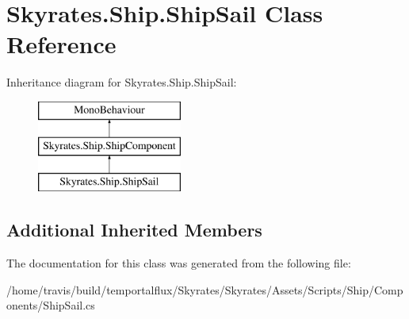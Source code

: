 \hypertarget{class_skyrates_1_1_ship_1_1_ship_sail}{\section{Skyrates.\-Ship.\-Ship\-Sail Class Reference}
\label{class_skyrates_1_1_ship_1_1_ship_sail}
}
Inheritance diagram for Skyrates.\-Ship.\-Ship\-Sail\-:\begin{figure}[H]
\begin{center}
\leavevmode
\includegraphics[height=3.000000cm]{class_skyrates_1_1_ship_1_1_ship_sail}
\end{center}
\end{figure}
\subsection*{Additional Inherited Members}


The documentation for this class was generated from the following file\-:\begin{DoxyCompactItemize}
\item 
/home/travis/build/temportalflux/\-Skyrates/\-Skyrates/\-Assets/\-Scripts/\-Ship/\-Components/Ship\-Sail.\-cs\end{DoxyCompactItemize}
